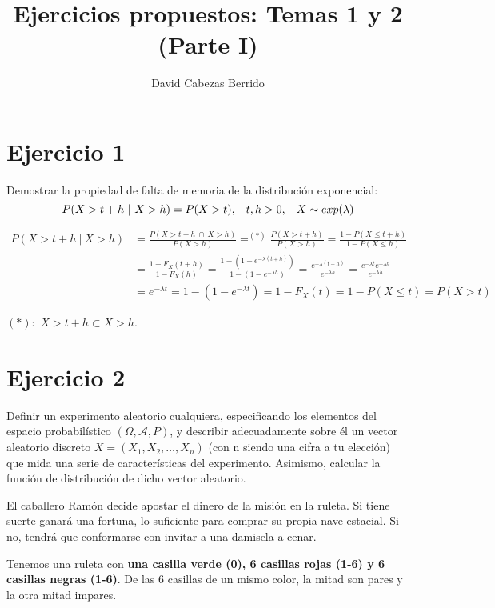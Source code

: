 \documentclass{article}
\begin{document}
\title{Ejercicios propuestos: Temas 1 y 2 (Parte I)}
\author{David Cabezas Berrido}
\date{}
\maketitle

\section*{Ejercicio 1}
Demostrar la propiedad de falta de memoria de la distribución exponencial:
\[P(X>t+h \ | \ X>h) = P(X>t), \hspace{3mm} t,h > 0, \hspace{3mm} X \sim exp(\lambda)\]

\begin{align*}
  P(X>t+h \ | \ X>h) &= \frac{P(X>t+h \ \cap \ X>h)}{P(X>h)} =^{(*)}
\frac{P(X>t+h)}{P(X>h)} = \frac{1-P(X \leq t+h)}{1-P(X \leq h)} \\
&=\frac{1-F_X(t+h)}{1-F_X(h)} =
\frac{1-(1-e^{-\lambda(t+h)})}{1-(1-e^{-\lambda h})} =
\frac{e^{-\lambda(t+h)}}{e^{-\lambda h}} = \frac{e^{-\lambda t}e^{-\lambda h}}{e^{-\lambda h}} \\ &= e^{-\lambda t} = 1-(1-e^{-\lambda t}) =
1-F_X(t) = 1-P(X \leq t) = P(X>t)
\end{align*}

$(*):$ $X>t+h \subset X>h$.

\section*{Ejercicio 2}
Definir un experimento aleatorio cualquiera, especificando los
elementos del espacio probabilístico $(\Omega, \mathcal{A}, P)$, y
describir adecuadamente sobre él un vector aleatorio discreto
$X = (X_1, X_2 , \ldots, X_n)$ (con n siendo una cifra a tu elección)
que mida una serie de características del experimento. Asimismo,
calcular la función de distribución de dicho vector aleatorio.

\vspace{10mm}

El caballero Ramón decide apostar el dinero de la misión en la ruleta.
Si tiene suerte ganará una fortuna, lo suficiente para comprar su
propia nave estacial. Si no, tendrá que conformarse con invitar a una
damisela a cenar.

Tenemos una ruleta con \textbf{una casilla verde (0), 6 casillas rojas
  (1-6) y 6 casillas negras (1-6)}. De las 6 casillas de un mismo
color, la mitad son pares y la otra mitad impares.
\end{document}

